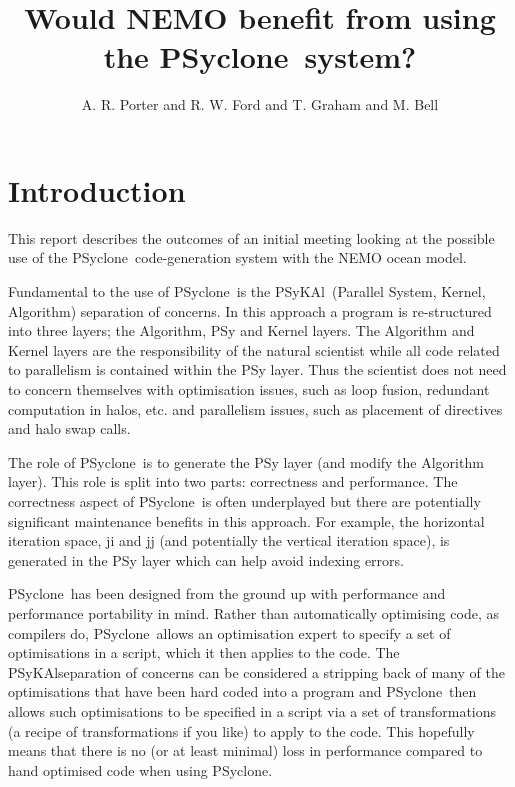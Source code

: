 \documentclass{article}
\newcommand{\psykal}{{PS}y{KA}l}
\newcommand{\psyclone}{{PS}yclone}
\begin{document}
\title{Would NEMO benefit from using the \psyclone\ system?}

\author{A. R. Porter and R. W. Ford and T. Graham and M. Bell}

\maketitle

\section{Introduction}

This report describes the outcomes of an initial meeting looking at
the possible use of the \psyclone\ code-generation system with the NEMO
ocean model.

Fundamental to the use of \psyclone\ is the \psykal\ (Parallel System,
Kernel, Algorithm) separation of concerns. In this approach a program
is re-structured into three layers; the Algorithm, PSy and Kernel
layers.  The Algorithm and Kernel layers are the responsibility of the
natural scientist while all code related to parallelism is contained
within the PSy layer. Thus the scientist does not need to concern
themselves with optimisation issues, such as loop fusion, redundant
computation in halos, etc. and parallelism issues, such as placement
of directives and halo swap calls.


The role of \psyclone\ is to generate the PSy layer (and modify the
Algorithm layer). This role is split into two parts: correctness and
performance. The correctness aspect of \psyclone\ is often underplayed
but there are potentially significant maintenance benefits in this
approach. For example, the horizontal iteration space, ji and jj (and
potentially the vertical iteration space), is generated in the PSy
layer which can help avoid indexing errors.

\psyclone\ has been designed from the ground up with performance and
performance portability in mind. Rather than automatically optimising
code, as compilers do, \psyclone\ allows an optimisation expert to
specify a set of optimisations in a script, which it then applies to
the code. The \psykal separation of concerns can be considered a
stripping back of many of the optimisations that have been hard coded
into a program and \psyclone\ then allows such optimisations to be
specified in a script via a set of transformations (a recipe of
transformations if you like) to apply to the code. This hopefully
means that there is no (or at least minimal) loss in performance
compared to hand optimised code when using \psyclone.
\end{document}
